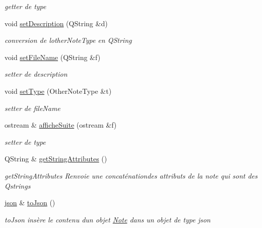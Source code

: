 \begin{DoxyCompactItemize}
\begin{DoxyCompactList}\small\item\em getter de type \end{DoxyCompactList}\item 
\mbox{\label{classOtherNote_a04476e29e0e4286b2ba1cb4263123c9c}} 
void \hyperlink{classOtherNote_a04476e29e0e4286b2ba1cb4263123c9c}{set\+Description} (Q\+String \&d)
\begin{DoxyCompactList}\small\item\em conversion de l\textquotesingle{}other\+Note\+Type en Q\+String \end{DoxyCompactList}\item 
\mbox{\label{classOtherNote_a21d52f354401f3f6eb1e9d79b7a0cbff}} 
void \hyperlink{classOtherNote_a21d52f354401f3f6eb1e9d79b7a0cbff}{set\+File\+Name} (Q\+String \&f)
\begin{DoxyCompactList}\small\item\em setter de description \end{DoxyCompactList}\item 
\mbox{\label{classOtherNote_a301a81c0fec029f78a992ff80264a1b8}} 
void \hyperlink{classOtherNote_a301a81c0fec029f78a992ff80264a1b8}{set\+Type} (Other\+Note\+Type \&t)
\begin{DoxyCompactList}\small\item\em setter de file\+Name \end{DoxyCompactList}\item 
ostream \& \hyperlink{classOtherNote_acff4b0946c0ce0a4e15bad6cbb8ff13d}{affiche\+Suite} (ostream \&f)
\begin{DoxyCompactList}\small\item\em setter de type \end{DoxyCompactList}\item 
Q\+String \& \hyperlink{classOtherNote_a3f475cf0cfc1a9cd8785618c0a7f3496}{get\+String\+Attributes} ()
\begin{DoxyCompactList}\small\item\em get\+String\+Attributes Renvoie une concaténationdes attributs de la note qui sont des Qstrings \end{DoxyCompactList}\item 
\hyperlink{classnlohmann_1_1basic__json}{json} \& \hyperlink{classOtherNote_a0fb04e9da102ac17fb777f29bfc24a57}{to\+Json} ()
\begin{DoxyCompactList}\small\item\em to\+Json insère le contenu d\textquotesingle{}un objet \hyperlink{classNote}{Note} dans un objet de type json \end{DoxyCompactList}\end{DoxyCompactItemize}
